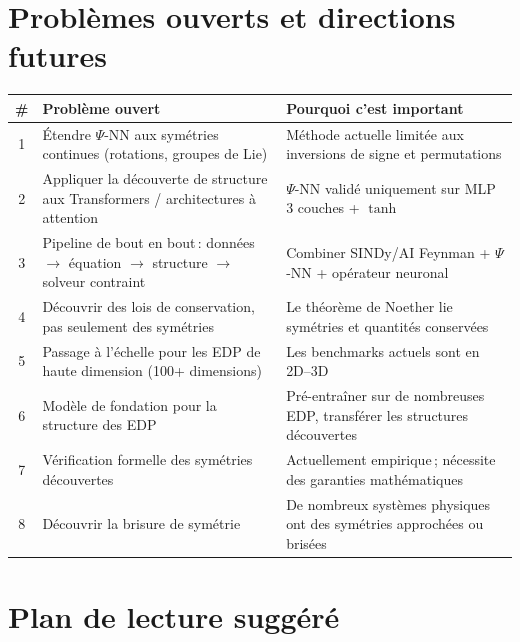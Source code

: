 \documentclass[11pt,a4paper]{article}
\begin{document}
\section{Problèmes ouverts et directions futures}

\begin{center}
\renewcommand{\arraystretch}{1.4}
\begin{tabular}{@{}c p{5cm} p{6.5cm}@{}}
\toprule
\textbf{\#} & \textbf{Problème ouvert} & \textbf{Pourquoi c'est important} \\
\midrule
1 & Étendre $\Psi$-NN aux symétries continues (rotations, groupes de Lie) & Méthode actuelle limitée aux inversions de signe et permutations \\
2 & Appliquer la découverte de structure aux Transformers / architectures à attention & $\Psi$-NN validé uniquement sur MLP 3 couches + $\tanh$ \\
3 & Pipeline de bout en bout\,: données $\to$ équation $\to$ structure $\to$ solveur contraint & Combiner SINDy/AI Feynman + $\Psi$-NN + opérateur neuronal \\
4 & Découvrir des lois de conservation, pas seulement des symétries & Le théorème de Noether lie symétries et quantités conservées \\
5 & Passage à l'échelle pour les EDP de haute dimension (100+ dimensions) & Les benchmarks actuels sont en 2D--3D \\
6 & Modèle de fondation pour la structure des EDP & Pré-entraîner sur de nombreuses EDP, transférer les structures découvertes \\
7 & Vérification formelle des symétries découvertes & Actuellement empirique\,; nécessite des garanties mathématiques \\
8 & Découvrir la brisure de symétrie & De nombreux systèmes physiques ont des symétries approchées ou brisées \\
\bottomrule
\end{tabular}
\end{center}

\section{Plan de lecture suggéré}
\end{document}

